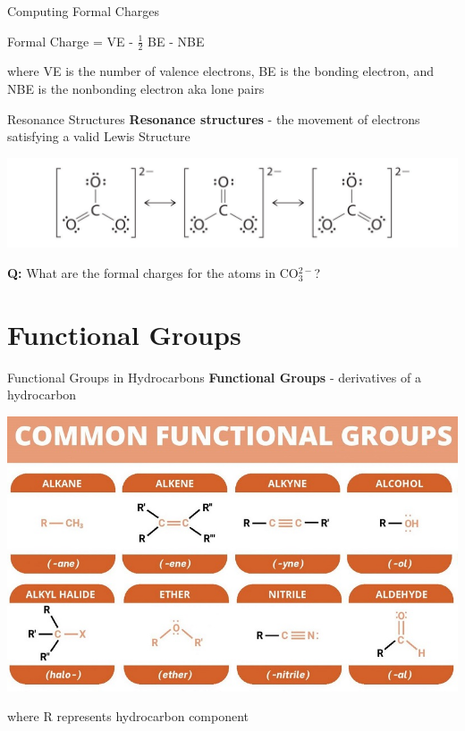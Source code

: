\documentclass[11pt]{beamer}
\begin{document}
\begin{frame}{Computing Formal Charges}
  \begin{center}
    Formal Charge = VE - $\frac{1}{2}$ BE - NBE
  \end{center}
  where VE is the number of valence electrons, BE is the bonding
  electron, and NBE is the nonbonding electron aka lone pairs
\end{frame}

\begin{frame}{Resonance Structures}
  \textbf{Resonance structures} - the movement of electrons satisfying
  a valid Lewis Structure
  
  \begin{center}
    \includegraphics[width=1\linewidth]{resonance_struct}
  \end{center}
  
  \textbf{Q:} What are the formal charges for the atoms in CO$_3^{2-}$?
\end{frame}

\section{Functional Groups}

\begin{frame}{Functional Groups in Hydrocarbons}
  \textbf{Functional Groups} - derivatives of a hydrocarbon
  \begin{center}
    \includegraphics[width=0.8\linewidth]{func_groups}
  \end{center}
  where R represents hydrocarbon component
\end{frame}
\end{document}
